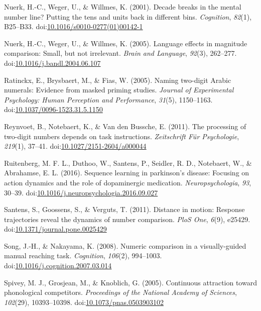\documentclass[english,man]{apa6}
\theoremstyle{definition}
\theoremstyle{definition}
\theoremstyle{definition}
\theoremstyle{remark}
\begin{document}
\hypertarget{ref-nuerk2001}{}
Nuerk, H.-C., Weger, U., \& Willmes, K. (2001). Decade breaks in the
mental number line? Putting the tens and units back in different bins.
\emph{Cognition}, \emph{82}(1), B25--B33.
doi:\href{https://doi.org/10.1016/s0010-0277(01)00142-1}{10.1016/s0010-0277(01)00142-1}

\hypertarget{ref-nuerk2005language}{}
Nuerk, H.-C., Weger, U., \& Willmes, K. (2005). Language effects in
magnitude comparison: Small, but not irrelevant. \emph{Brain and
Language}, \emph{92}(3), 262--277.
doi:\href{https://doi.org/10.1016/j.bandl.2004.06.107}{10.1016/j.bandl.2004.06.107}

\hypertarget{ref-ratinckx2005}{}
Ratinckx, E., Brysbaert, M., \& Fias, W. (2005). Naming two-digit Arabic
numerals: Evidence from masked priming studies. \emph{Journal of
Experimental Psychology: Human Perception and Performance},
\emph{31}(5), 1150--1163.
doi:\href{https://doi.org/10.1037/0096-1523.31.5.1150}{10.1037/0096-1523.31.5.1150}

\hypertarget{ref-reynvoet2011}{}
Reynvoet, B., Notebaert, K., \& Van den Bussche, E. (2011). The
processing of two-digit numbers depends on task instructions.
\emph{Zeitschrift Für Psychologie}, \emph{219}(1), 37--41.
doi:\href{https://doi.org/10.1027/2151-2604/a000044}{10.1027/2151-2604/a000044}

\hypertarget{ref-ruitenberg2016}{}
Ruitenberg, M. F. L., Duthoo, W., Santens, P., Seidler, R. D.,
Notebaert, W., \& Abrahamse, E. L. (2016). Sequence learning in
parkinson's disease: Focusing on action dynamics and the role of
dopaminergic medication. \emph{Neuropsychologia}, \emph{93}, 30--39.
doi:\href{https://doi.org/10.1016/j.neuropsychologia.2016.09.027}{10.1016/j.neuropsychologia.2016.09.027}

\hypertarget{ref-santens2011}{}
Santens, S., Goossens, S., \& Verguts, T. (2011). Distance in motion:
Response trajectories reveal the dynamics of number comparison.
\emph{PloS One}, \emph{6}(9), e25429.
doi:\href{https://doi.org/10.1371/journal.pone.0025429}{10.1371/journal.pone.0025429}

\hypertarget{ref-songNakayama2008}{}
Song, J.-H., \& Nakayama, K. (2008). Numeric comparison in a
visually-guided manual reaching task. \emph{Cognition}, \emph{106}(2),
994--1003.
doi:\href{https://doi.org/10.1016/j.cognition.2007.03.014}{10.1016/j.cognition.2007.03.014}

\hypertarget{ref-spivey2005}{}
Spivey, M. J., Grosjean, M., \& Knoblich, G. (2005). Continuous
attraction toward phonological competitors. \emph{Proceedings of the
National Academy of Sciences}, \emph{102}(29), 10393--10398.
doi:\href{https://doi.org/10.1073/pnas.0503903102}{10.1073/pnas.0503903102}
\end{document}
